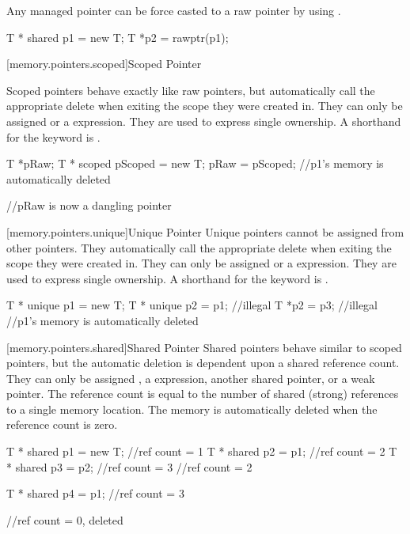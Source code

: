 Any managed pointer can be force casted to a raw pointer by using .

\begin{codeblock}

T * shared p1 = new T;
T *p2 = rawptr(p1);

\end{codeblock}


[memory.pointers.scoped]{Scoped Pointer}

Scoped pointers behave exactly like raw pointers, but automatically call the appropriate delete when exiting the scope they were created in. They can only be assigned  or a  expression. They are used to express single ownership. A shorthand for the  keyword is \tcode{!}.

\begin{codeblock}

T *pRaw;
{
	T * scoped pScoped = new T;
	pRaw = pScoped;
} //p1's memory is automatically deleted

//pRaw is now a dangling pointer

\end{codeblock}

[memory.pointers.unique]{Unique Pointer}
Unique pointers cannot be assigned from other pointers. They automatically call the appropriate delete when exiting the scope they were created in. They can only be assigned  or a  expression. They are used to express single ownership. A shorthand for the  keyword is \tcode{\^}.


\begin{codeblock}
{
	T * unique p1 = new T;
	T * unique p2 = p1; //illegal
	T *p2 = p3; //illegal
} //p1's memory is automatically deleted

\end{codeblock}

[memory.pointers.shared]{Shared Pointer}
Shared pointers behave similar to scoped pointers, but the automatic deletion is dependent upon a shared reference count. They can only be assigned , a  expression, another shared pointer, or a weak pointer. The reference count is equal to the number of shared (strong) references to a single memory location. The memory is automatically deleted when the reference count is zero.

\begin{codeblock}

{
	T * shared p1 = new T;	//ref count = 1
	T * shared p2 = p1;		//ref count = 2
	{
		T * shared p3 = p2;	//ref count = 3
	} //ref count = 2

	T * shared p4 = p1;	//ref count = 3
} //ref count = 0, deleted

\end{codeblock}


